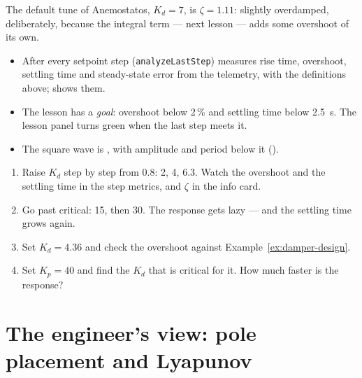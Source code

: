 The default tune of Anemostatos, $K_d = 7$, is $\zeta = 1.11$: slightly overdamped, deliberately, because the integral term — next lesson — adds some overshoot of its own.


\begin{inapp}
\begin{itemize}[leftmargin=1.2em]
  \item After every setpoint step  (\texttt{analyzeLastStep}) measures rise time, overshoot, settling time and steady-state error from the telemetry, with the definitions above;  shows them.
  \item The lesson has a \emph{goal}: overshoot below 2\,\% and settling time below \SI{2.5}{s}. The lesson panel turns green when the last step meets it.
  \item The square wave is , with amplitude and period below it ().
\end{itemize}
\end{inapp}

\begin{trythis}
\begin{enumerate}
  \item Raise $K_d$ step by step from 0.8: 2, 4, 6.3. Watch the overshoot and the settling time in the step metrics, and $\zeta$ in the info card.
  \item Go past critical: 15, then 30. The response gets lazy — and the settling time grows again.
  \item Set $K_d = 4.36$ and check the overshoot against Example~\ref{ex:damper-design}.
  \item Set $K_p = 40$ and find the $K_d$ that is critical for it. How much faster is the response?
\end{enumerate}
\end{trythis}

\section{The engineer's view: pole placement and Lyapunov}

